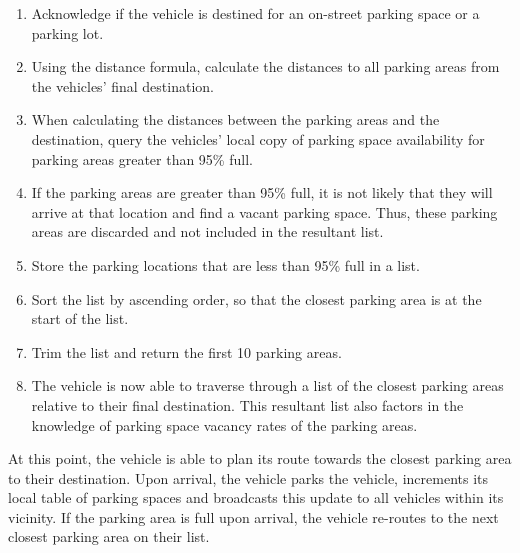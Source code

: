 \begin{enumerate}
    \item Acknowledge if the vehicle is destined for an on-street parking space or a parking lot.
    \item Using the distance formula, calculate the distances to all parking areas from the vehicles' final destination.
    \item When calculating the distances between the parking areas and the destination, query the vehicles' local copy of parking space availability for parking areas greater than 95\% full.
    \item If the parking areas are greater than 95\% full, it is not likely that they will arrive at that location and find a vacant parking space. Thus, these parking areas are discarded and not included in the resultant list.
    \item Store the parking locations that are less than 95\% full in a list.
    \item Sort the list by ascending order, so that the closest parking area is at the start of the list.
    \item Trim the list and return the first 10 parking areas.
    \item The vehicle is now able to traverse through a list of the closest parking areas relative to their final destination. This resultant list also factors in the knowledge of parking space vacancy rates of the parking areas.
\end{enumerate}

At this point, the vehicle is able to plan its route towards the closest parking area to their destination. Upon arrival, the vehicle parks the vehicle, increments its local table of parking spaces and broadcasts this update to all vehicles within its vicinity. If the parking area is full upon arrival, the vehicle re-routes to the next closest parking area on their list.

